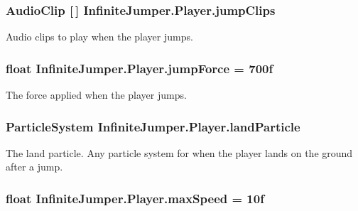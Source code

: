 \subsubsection[{jump\+Clips}]{\setlength{\rightskip}{0pt plus 5cm}Audio\+Clip \mbox{[}$\,$\mbox{]} Infinite\+Jumper.\+Player.\+jump\+Clips}\label{class_infinite_jumper_1_1_player_a531c3b41299bee812c3c1eb918749d1a}


Audio clips to play when the player jumps. 

\hypertarget{class_infinite_jumper_1_1_player_a0b83d3c7a02d866e230110ba3c1ac0da}{}
\subsubsection[{jump\+Force}]{\setlength{\rightskip}{0pt plus 5cm}float Infinite\+Jumper.\+Player.\+jump\+Force = 700f}\label{class_infinite_jumper_1_1_player_a0b83d3c7a02d866e230110ba3c1ac0da}


The force applied when the player jumps. 

\hypertarget{class_infinite_jumper_1_1_player_a6377b4864639982c835b912f3dbe0552}{}
\subsubsection[{land\+Particle}]{\setlength{\rightskip}{0pt plus 5cm}Particle\+System Infinite\+Jumper.\+Player.\+land\+Particle}\label{class_infinite_jumper_1_1_player_a6377b4864639982c835b912f3dbe0552}


The land particle. Any particle system for when the player lands on the ground after a jump. 

\hypertarget{class_infinite_jumper_1_1_player_a77e2cc98878effd33f249f0e58d30d23}{}
\subsubsection[{max\+Speed}]{\setlength{\rightskip}{0pt plus 5cm}float Infinite\+Jumper.\+Player.\+max\+Speed = 10f}\label{class_infinite_jumper_1_1_player_a77e2cc98878effd33f249f0e58d30d23}


